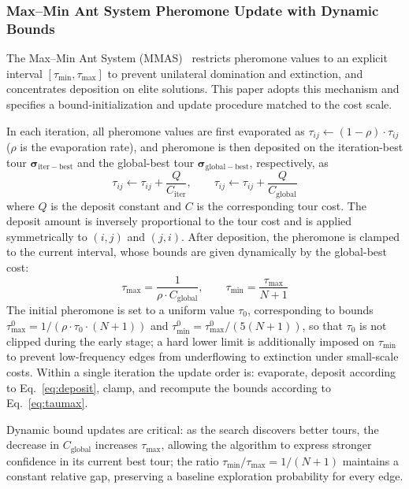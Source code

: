 \documentclass[lettersize,journal]{IEEEtran}
\begin{document}
\subsubsection{Max--Min Ant System Pheromone Update with Dynamic Bounds}

The Max--Min Ant System (MMAS)~\textcolor{blue}{\cite{ref23}} restricts pheromone values to an explicit interval $[\tau_{\min}, \tau_{\max}]$ to prevent unilateral domination and extinction, and concentrates deposition on elite solutions. This paper adopts this mechanism and specifies a bound-initialization and update procedure matched to the cost scale.

In each iteration, all pheromone values are first evaporated as $\tau_{ij} \leftarrow (1 - \rho) \cdot \tau_{ij}$ ($\rho$ is the evaporation rate), and pheromone is then deposited on the iteration-best tour $\bm{\sigma}_{\mathrm{iter-best}}$ and the global-best tour $\bm{\sigma}_{\mathrm{global-best}}$, respectively, as
\begin{equation}
\tau_{ij} \leftarrow \tau_{ij} + \frac{Q}{C_{\mathrm{iter}}}, \qquad
\tau_{ij} \leftarrow \tau_{ij} + \frac{Q}{C_{\mathrm{global}}}
\label{eq:deposit}
\end{equation}
where $Q$ is the deposit constant and $C$ is the corresponding tour cost. The deposit amount is inversely proportional to the tour cost and is applied symmetrically to $(i,j)$ and $(j,i)$. After deposition, the pheromone is clamped to the current interval, whose bounds are given dynamically by the global-best cost:
\begin{equation}
\tau_{\max} = \frac{1}{\rho \cdot C_{\mathrm{global}}}, \qquad
\tau_{\min} = \frac{\tau_{\max}}{N+1}
\label{eq:taumax}
\end{equation}
The initial pheromone is set to a uniform value $\tau_0$, corresponding to bounds $\tau_{\max}^{0} = 1/(\rho \cdot \tau_0 \cdot (N+1))$ and $\tau_{\min}^{0} = \tau_{\max}^{0}/(5(N+1))$, so that $\tau_0$ is not clipped during the early stage; a hard lower limit is additionally imposed on $\tau_{\min}$ to prevent low-frequency edges from underflowing to extinction under small-scale costs. Within a single iteration the update order is: evaporate, deposit according to Eq.~\textcolor{blue}{\eqref{eq:deposit}}, clamp, and recompute the bounds according to Eq.~\textcolor{blue}{\eqref{eq:taumax}}.

Dynamic bound updates are critical: as the search discovers better tours, the decrease in $C_{\mathrm{global}}$ increases $\tau_{\max}$, allowing the algorithm to express stronger confidence in its current best tour; the ratio $\tau_{\min}/\tau_{\max} = 1/(N+1)$ maintains a constant relative gap, preserving a baseline exploration probability for every edge.
\end{document}
